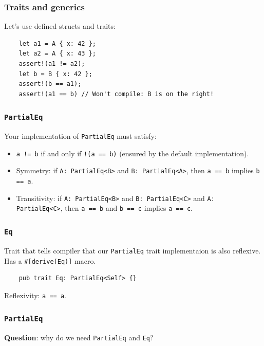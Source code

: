 \documentclass[aspectratio=1610,t]{beamer}
\begin{document}

\begin{frame}[fragile]
\frametitle{Traits and generics}
Let's use defined structs and traits:

\begin{verbatim}
    let a1 = A { x: 42 };
    let a2 = A { x: 43 };
    assert!(a1 != a2);
    let b = B { x: 42 };
    assert!(b == a1);
    assert!(a1 == b) // Won't compile: B is on the right!
\end{verbatim}
\end{frame}


\begin{frame}[fragile]
\frametitle{\texttt{PartialEq}}
Your implementation of \texttt{PartialEq} must satisfy:

\begin{itemize}
    \item \texttt{a != b} if and only if \texttt{!(a == b)} (ensured by the default implementation).
    \item Symmetry: if \texttt{A: PartialEq<B>} and \texttt{B: PartialEq<A>}, then \texttt{a == b} implies \texttt{b == a}.
    \item Transitivity: if \texttt{A: PartialEq<B>} and \texttt{B: PartialEq<C>} and \texttt{A: PartialEq<C>}, then \texttt{a == b} and \texttt{b == c} implies \texttt{a == c}.
\end{itemize}
\end{frame}


\begin{frame}[fragile]
\frametitle{\texttt{Eq}}
Trait that tells compiler that our \texttt{PartialEq} trait implementaion is also reflexive. Has a \texttt{\#[derive(Eq)]} macro.

\begin{verbatim}
    pub trait Eq: PartialEq<Self> {}
\end{verbatim}

Reflexivity: \texttt{a == a}.
\end{frame}


\begin{frame}[fragile]
\frametitle{\texttt{PartialEq}}
\textbf{Question}: why do we need \texttt{PartialEq} and \texttt{Eq}? 


\end{frame}
\end{document}
